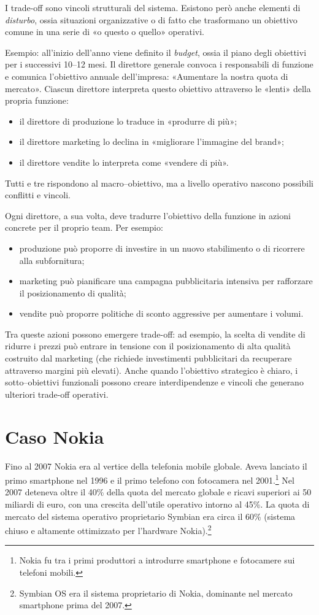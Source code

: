 \documentclass[a4paper,12pt]{article}
\begin{document}
	I trade-off sono vincoli strutturali del sistema.%
	Esistono però anche elementi di \emph{disturbo}, ossia situazioni organizzative o di fatto che trasformano un obiettivo comune in una serie di «o questo o quello» operativi.
	
	Esempio: all'inizio dell'anno viene definito il \emph{budget}, ossia il piano degli obiettivi per i successivi 10--12 mesi.%
	Il direttore generale convoca i responsabili di funzione e comunica l'obiettivo annuale dell'impresa: «Aumentare la nostra quota di mercato».%
	Ciascun direttore interpreta questo obiettivo attraverso le «lenti» della propria funzione:
	\begin{itemize}
		\item il direttore di produzione lo traduce in «produrre di più»;
		\item il direttore marketing lo declina in «migliorare l'immagine del brand»;
		\item il direttore vendite lo interpreta come «vendere di più».
	\end{itemize}
	Tutti e tre rispondono al macro–obiettivo, ma a livello operativo nascono possibili conflitti e vincoli.
	
	Ogni direttore, a sua volta, deve tradurre l'obiettivo della funzione in azioni concrete per il proprio team.%
	Per esempio:
	\begin{itemize}
		\item produzione può proporre di investire in un nuovo stabilimento o di ricorrere alla subfornitura;
		\item marketing può pianificare una campagna pubblicitaria intensiva per rafforzare il posizionamento di qualità;
		\item vendite può proporre politiche di sconto aggressive per aumentare i volumi.
	\end{itemize}
	Tra queste azioni possono emergere trade-off: ad esempio, la scelta di vendite di ridurre i prezzi può entrare in tensione con il posizionamento di alta qualità costruito dal marketing (che richiede investimenti pubblicitari da recuperare attraverso margini più elevati).%
	Anche quando l'obiettivo strategico è chiaro, i sotto–obiettivi funzionali possono creare interdipendenze e vincoli che generano ulteriori trade-off operativi.
	
	\section{Caso Nokia}
	
	Fino al 2007 Nokia era al vertice della telefonia mobile globale.%
	Aveva lanciato il primo smartphone nel 1996 e il primo telefono con fotocamera nel 2001.\footnote{Nokia fu tra i primi produttori a introdurre smartphone e fotocamere sui telefoni mobili.} 
	Nel 2007 deteneva oltre il 40\% della quota del mercato globale e ricavi superiori ai 50 miliardi di euro, con una crescita dell'utile operativo intorno al 45\%.%
	La quota di mercato del sistema operativo proprietario Symbian era circa il 60\% (sistema chiuso e altamente ottimizzato per l'hardware Nokia).\footnote{Symbian OS era il sistema proprietario di Nokia, dominante nel mercato smartphone prima del 2007. } 
	
\end{document}
